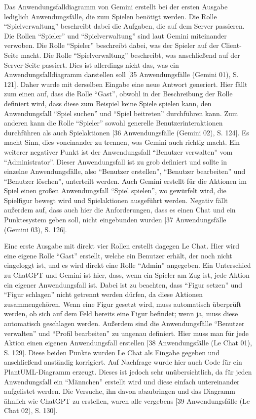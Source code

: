 Das Anwendungsfalldiagramm von Gemini erstellt bei der ersten Ausgabe lediglich Anwendungsfälle, die zum Spielen benötigt werden. Die Rolle 
``Spielverwaltung'' beschreibt dabei die Aufgaben, die auf dem Server passieren. Die Rollen ``Spieler'' und ``Spielverwaltung'' sind laut Gemini 
miteinander verwoben. Die Rolle ``Spieler'' beschreibt dabei, was der Spieler auf der Client-Seite macht. Die Rolle ``Spielverwaltung'' beschreibt, 
was anschließend auf der Server-Seite passiert. Dies ist allerdings nicht das, was ein Anwendungsfalldiagramm darstellen soll 
[35 Anwendungsfälle (Gemini 01), S. 121]. Daher wurde mit derselben Eingabe eine neue Antwort generiert. Hier fällt zum einen auf, dass die Rolle 
``Gast'', obwohl in der Beschreibung der Rolle definiert wird, dass diese zum Beispiel keine Spiele spielen kann, den Anwendungsfall ``Spiel suchen'' 
und ``Spiel beitreten'' durchführen kann. Zum anderen kann die Rolle ``Spieler'' sowohl generelle Benutzerinteraktionen durchführen als auch 
Spielaktionen [36 Anwendungsfälle (Gemini 02), S. 124]. Es macht Sinn, dies voneinander zu trennen, was Gemini auch richtig macht. Ein weiterer 
negativer Punkt ist der Anwendungsfall ``Benutzer verwalten'' vom ``Administrator''. Dieser Anwendungsfall ist zu grob definiert und sollte in einzelne 
Anwendungsfälle, also ``Benutzer erstellen'', ``Benutzer bearbeiten'' und ``Benutzer löschen'', unterteilt werden. Auch Gemini erstellt für die Aktionen 
im Spiel einen großen Anwendungsfall ``Spiel spielen'', wo gewürfelt wird, die Spielfigur bewegt wird und Spielaktionen ausgeführt werden. Negativ 
fällt außerdem auf, dass auch hier die Anforderungen, dass es einen Chat und ein Punktesystem geben soll, nicht eingebunden wurden 
[37 Anwendungsfälle (Gemini 03), S. 126].

Eine erste Ausgabe mit direkt vier Rollen erstellt dagegen Le Chat. Hier wird eine eigene Rolle ``Gast'' erstellt, welche ein Benutzer 
erhält, der noch nicht eingeloggt ist, und es wird direkt eine Rolle ``Admin'' angegeben. Ein Unterschied zu ChatGPT und Gemini ist hier, 
dass, wenn ein Spieler am Zug ist, jede Aktion ein eigener Anwendungsfall ist. Dabei ist zu beachten, dass ``Figur setzen'' und 
``Figur schlagen'' nicht getrennt werden dürfen, da diese Aktionen zusammengehören. Wenn eine Figur gesetzt wird, muss automatisch überprüft 
werden, ob sich auf dem Feld bereits eine Figur befindet; wenn ja, muss diese automatisch geschlagen werden. Außerdem sind die Anwendungsfälle 
``Benutzer verwalten'' und ``Profil bearbeiten'' zu ungenau definiert. Hier muss man für jede Aktion einen eigenen Anwendungsfall erstellen 
[38 Anwendungsfälle (Le Chat 01), S. 129]. Diese beiden Punkte wurden Le Chat als Eingabe gegeben und anschließend anständig korrigiert. 
Auf Nachfrage wurde hier auch Code für ein PlantUML-Diagramm erzeugt. Dieses ist jedoch sehr unübersichtlich, da für jeden Anwendungsfall 
ein ``Männchen'' erstellt wird und diese einfach untereinander aufgelistet werden. Die Versuche, ihn davon abzubringen und das Diagramm ähnlich 
wie ChatGPT zu erstellen, waren alle vergebens [39 Anwendungsfälle (Le Chat 02), S. 130].


